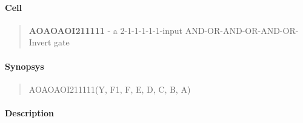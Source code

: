\label{AOAOAOI211111}
\paragraph{Cell}
\begin{quote}
    \textbf{AOAOAOI211111} - a 2-1-1-1-1-1-input AND-OR-AND-OR-AND-OR-Invert gate
\end{quote}

\paragraph{Synopsys}
\begin{quote}
    AOAOAOI211111(Y, F1, F, E, D, C, B, A)
\end{quote}

\paragraph{Description}

%

